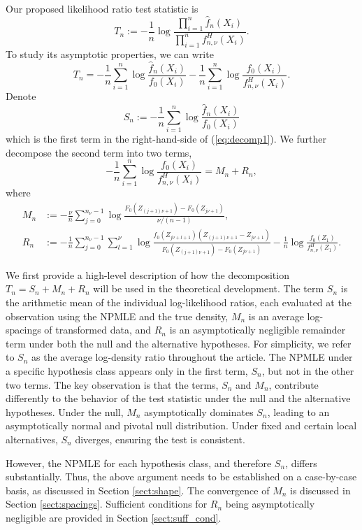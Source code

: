 \documentclass[12pt,letterpaper, twoside, openany]{article}
\theoremstyle{plain}
\begin{document}
Our proposed likelihood ratio test statistic is
\begin{equation*}
T_n :=  -\frac{1}{n}\log \frac{\prod^n_{i=1} \hat{f}_n(X_i)}{\prod^n_{i=1}f^H_{n,\nu}(X_i)}.
\end{equation*}
To study its asymptotic properties, we can write
\begin{equation} \label{eq:decomp1}
T_n = - \frac{1}{n}\sum^n_{i=1} \log \frac{\hat{f}_n(X_i)}{f_0(X_i)} - \frac{1}{n}\sum^n_{i=1} \log \frac{f_0(X_i)}{f^H_{n,\nu}(X_i)}.
\end{equation}
Denote
\[
S_n := - \frac{1}{n}\sum^n_{i=1} \log \frac{\hat{f}_n(X_i)}{f_0(X_i)}
\]
which is the first term in the right-hand-side of (\ref{eq:decomp1}).  We further decompose the second term into two terms,
\begin{equation}\label{eq:decomposition_hist}
-\frac{1}{n}\sum^n_{i=1} \log \frac{f_0(X_i)}{f^H_{n,\nu}(X_i)} =M_n+R_n  ,    
\end{equation}
where
\begin{align*}
M_n &:= -  \frac{\nu}{n} \sum_{j=0}^{n_{\nu} - 1} 
\log \frac{F_0(Z_{(j+1)\nu+1}) - F_0(Z_{j\nu+1})}{\nu/(n-1)},\\
%
R_n&:=	- \frac{1}{n} \sum_{j=0}^{n_{\nu} - 1} 
\sum^\nu_{l=1} \log \frac{f_0(Z_{j\nu+l+1})(Z_{(j+1)\nu+1} - Z_{j\nu+1})}{F_0(Z_{(j+1)\nu+1}) - F_0(Z_{j\nu+1})} -\frac{1}{n} \log \frac{f_0(Z_1)}{f^H_{n,\nu}(Z_1)}.
\end{align*}

We first provide a high-level description of how the decomposition $T_n=S_n+M_n+R_n$ will be used in the theoretical development.  The term $S_n$ is the arithmetic mean of the individual log-likelihood ratios, each evaluated at the observation using the NPMLE and the true density, $M_n$ is an average log-spacings of transformed data, and $R_n$ is an asymptotically negligible remainder term under both the null and the alternative hypotheses. For simplicity, we refer to $S_n$ as the average log-density ratio throughout the article.
The NPMLE under a specific hypothesis class appears only in the first term, $S_n$, but not in the other two terms. The key observation is that the terms, $S_n$ and $M_n$, contribute differently to the behavior of the test statistic under the null and the alternative hypotheses.  Under the null, $M_n$ asymptotically dominates $S_n$, leading to an asymptotically normal and pivotal null distribution.  Under fixed and certain local alternatives, $S_n$ diverges, ensuring the test is consistent. 

However, the NPMLE for each hypothesis class, and therefore $S_n$, differs substantially. Thus, the above argument needs to be established on a case-by-case basis, as discussed in Section \ref{sect:shape}.  The convergence of $M_n$ is discussed in Section \ref{sect:spacings}.  Sufficient conditions for $R_n$ being asymptotically negligible are provided in Section \ref{sect:suff_cond}. 
\end{document}
